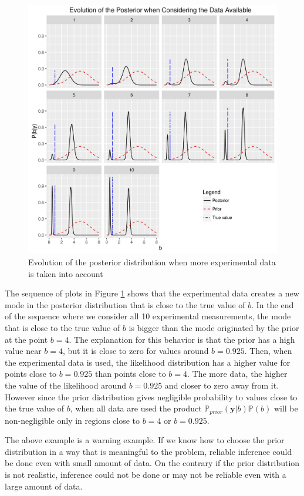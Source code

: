 \documentclass[12pt]{book}
\newcommand{\prior}{\mathbb{P}_{prior}}
\newcommand{\p}{\mathbb{P}}
\newcommand{\y}{\textbf{y}}
\begin{document}
\begin{figure}[H]
\centering
\includegraphics[scale=0.7]{./FigChap3/posterior_evolution}
\caption{Evolution of the posterior distribution when more experimental data is taken into account}
\label{figpostevolution}
\end{figure}

The sequence of plots in Figure \ref{figpostevolution} shows that the experimental data creates a new mode
in the posterior distribution that is close to the true value of $b$. In the end of the sequence where we consider
all 10 experimental measurements, the mode that is close to the true value of $b$ is bigger than the mode originated
by the prior at the point $b=4$. The explanation for this behavior  is that the prior  has a high value near $b=4$, 
but it is close to zero for values around $b=0.925$.
Then, when the experimental data is used, the likelihood distribution has a higher  value for points  close to $b=0.925$
than points close to $b=4$. The more data, the higher the value of the likelihood around $b=0.925$ and closer to zero
away from it. However since
the prior distribution gives negligible probability to values close to the true value of $b$, when all data are used the 
product $\prior(\y|b)\p(b)$ will be non-negligible only in regions close to $b=4$ or $b=0.925$.

The above example is a warning example. If we know how to choose the prior distribution in a way that is meaningful to the
problem, reliable inference could be done even with small amount of data. On the contrary if the prior distribution
is not realistic, inference could not be done or  may not be reliable even with a large amount of data.  
\newpage
\end{document}
